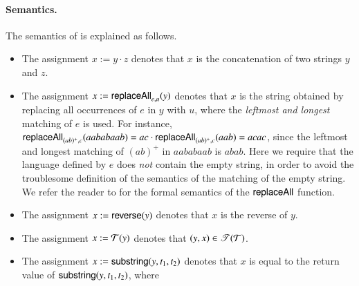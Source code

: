 \paragraph*{Semantics.}
The semantics of {\slint} is explained as follows. %
\begin{itemize}
\item The assignment $x:=y \cdot z$ denotes that $x$ is the concatenation of two strings $y$ and $z$.

\item The assignment $x:=\mathsf{replaceAll}_{e,u}(y)$ denotes that $x$ is the string obtained by replacing all occurrences of $e$ in $y$ with $u$, where the \emph{leftmost and longest} matching of $e$ is used. For instance, $\mathsf{replaceAll}_{(ab)^+,c}(aababaab) =ac \cdot \mathsf{replaceAll}_{(ab)^+,c}(aab)= acac$, since the leftmost and longest matching of $(ab)^+$ in $aababaab$ is $abab$. Here we require that the language defined by $e$ does \emph{not} contain the empty string, in order to avoid the troublesome definition of the semantics of the matching of the empty string. We refer the reader to \cite{CCH+18} for the formal semantics of the $\mathsf{replaceAll}$ function.
%
\item The assignment $x:=\mathsf{reverse}(y)$ denotes that $x$ is the reverse of $y$.
%
\item The assignment $x:=\mathcal{T}(y)$ denotes that $(y,x) \in \mathscr{T}(\mathcal{T})$. %
%
\item The assignment $x:=\mathsf{substring}(y, t_1, t_2)$ denotes that $x$ is equal to the return value of $\mathsf{substring}(y, t_1, t_2)$, where 


\end{itemize}
